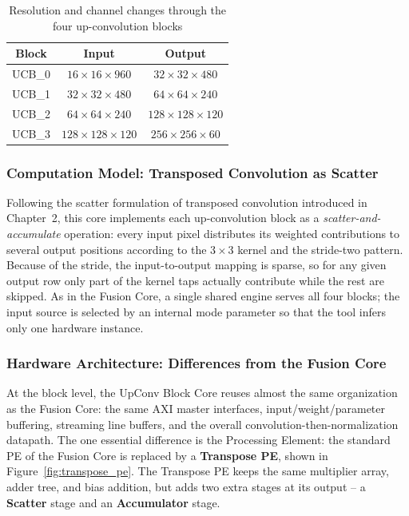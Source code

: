 \begin{table}[H]
\centering
\caption{Resolution and channel changes through the four up-convolution blocks}
\label{tab:upconv_steps}
\begin{tabular}{|c|c|c|}
\hline
\textbf{Block} & \textbf{Input} & \textbf{Output} \\
\hline
UCB\_0 & $16\times16\times960$ & $32\times32\times480$ \\
\hline
UCB\_1 & $32\times32\times480$ & $64\times64\times240$ \\
\hline
UCB\_2 & $64\times64\times240$ & $128\times128\times120$ \\
\hline
UCB\_3 & $128\times128\times120$ & $256\times256\times60$ \\
\hline
\end{tabular}
\end{table}

\subsubsection*{Computation Model: Transposed Convolution as Scatter}

Following the scatter formulation of transposed convolution introduced in Chapter~2, this core implements each up-convolution block as a \emph{scatter-and-accumulate} operation: every input pixel distributes its weighted contributions to several output positions according to the $3\times3$ kernel and the stride-two pattern. Because of the stride, the input-to-output mapping is sparse, so for any given output row only part of the kernel taps actually contribute while the rest are skipped. As in the Fusion Core, a single shared engine serves all four blocks; the input source is selected by an internal mode parameter so that the tool infers only one hardware instance.

\subsubsection*{Hardware Architecture: Differences from the Fusion Core}

At the block level, the UpConv Block Core reuses almost the same organization as the Fusion Core: the same AXI master interfaces, input/weight/parameter buffering, streaming line buffers, and the overall convolution-then-normalization datapath. The one essential difference is the Processing Element: the standard PE of the Fusion Core is replaced by a \textbf{Transpose PE}, shown in Figure~\ref{fig:transpose_pe}. The Transpose PE keeps the same multiplier array, adder tree, and bias addition, but adds two extra stages at its output -- a \textbf{Scatter} stage and an \textbf{Accumulator} stage.

